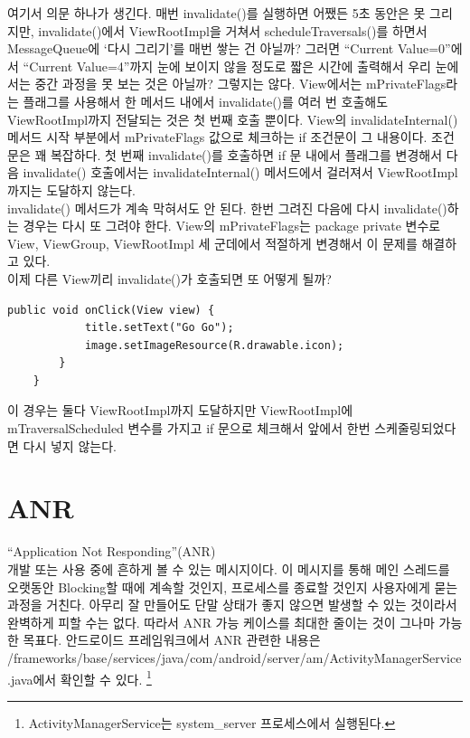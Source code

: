 여기서 의문 하나가 생긴다. 
매번 invalidate()를 실행하면 어쨌든 5초 동안은 못 그리지만, 
invalidate()에서 ViewRootImpl을 거쳐서 scheduleTraversals()를 하면서 MessageQueue에 `다시 그리기'를 매번 쌓는 건 아닐까? 
그러면 ``Current Value=0''에서 ``Current Value=4''까지 눈에 보이지 않을 정도로 짧은 시간에 출력해서 우리 눈에서는 중간 과정을 못 보는 것은 아닐까?
그렇지는 않다. View에서는 mPrivateFlags라는 플래그를 사용해서 한 메서드 내에서 invalidate()를 여러 번 호출해도 ViewRootImpl까지 전달되는 것은 첫 번째 호출 뿐이다. View의 invalidateInternal() 메서드 시작 부분에서 mPrivateFlags 값으로 체크하는 if 조건문이 그 내용이다.
조건문은 꽤 복잡하다. 첫 번째 invalidate()를 호출하면 if 문 내에서 플래그를 변경해서 다음 invalidate() 호출에서는 invalidateInternal() 메서드에서 걸러져서 ViewRootImpl까지는 도달하지 않는다.\\

invalidate() 메서드가 계속 막혀서도 안 된다. 
한번 그려진 다음에 다시 invalidate()하는 경우는 다시 또 그려야 한다.
View의 mPrivateFlags는 package private 변수로 View, ViewGroup, ViewRootImpl 세 군데에서 적절하게 변경해서 이 문제를 해결하고 있다.\\

이제 다른 View끼리 invalidate()가 호출되면 또 어떻게 될까?
\begin{lstlisting}[frame=single] 
	public void onClick(View view) {
			title.setText("Go Go");
			image.setImageResource(R.drawable.icon);
		}
	}
\end{lstlisting}
이 경우는 둘다 ViewRootImpl까지 도달하지만 ViewRootImpl에 mTraversalScheduled 변수를 가지고 if 문으로 체크해서 앞에서 한번 스케줄링되었다면 다시 넣지 않는다.

\section{ANR}
``Application Not Responding''(ANR)\\
개발 또는 사용 중에 흔하게 볼 수 있는 메시지이다. 이 메시지를 통해 메인 스레드를 오랫동안 Blocking할 때에 계속할 것인지, 프로세스를 종료할 것인지 사용자에게 묻는 과정을 거친다. 
아무리 잘 만들어도 단말 상태가 좋지 않으면 발생할 수 있는 것이라서 완벽하게 피할 수는 없다. 따라서 ANR 가능 케이스를 최대한 줄이는 것이 그나마 가능한 목표다.
안드로이드 프레임워크에서 ANR 관련한 내용은 
/frameworks/base/services/java/com/android/server/am/ActivityManagerService.java에서 확인할 수 있다. \footnote{ActivityManagerService는 system\_server 프로세스에서 실행된다.}\\

